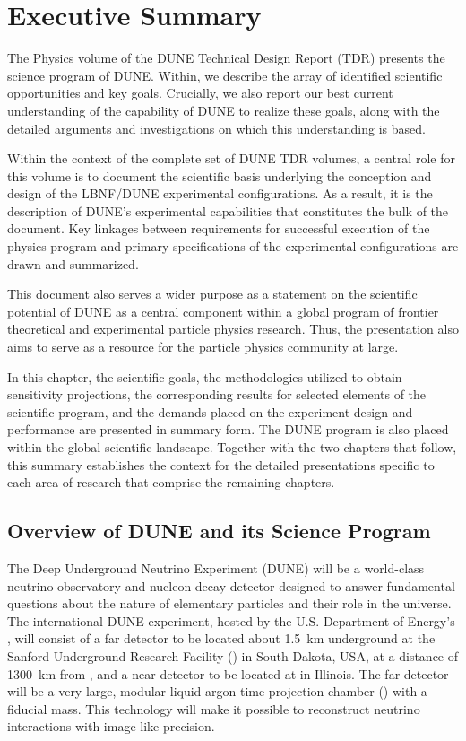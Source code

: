 \chapter{Executive Summary}
\label{ch:exec-summ}


The Physics volume of the DUNE Technical Design Report
(TDR) presents the science program of DUNE.
Within, we describe the array of 
identified scientific opportunities and key goals.  
Crucially, we also report our best current understanding
of the capability of DUNE to realize these goals,
along with the detailed arguments and investigations 
on which this understanding is based.

Within the context of the complete set of DUNE TDR volumes,
a central role for this volume is to document the scientific
basis underlying the conception and design of the LBNF/DUNE
experimental configurations.  As a result, it is the
description of DUNE's experimental capabilities that constitutes
the bulk of the document.  Key linkages between requirements for
successful execution of the physics program and
primary specifications of the experimental configurations
are drawn and summarized.

This document also serves a wider purpose as a statement on the
scientific potential of DUNE as a central component within
a global program of frontier theoretical and experimental
particle physics research. Thus, the presentation also
aims to serve as a resource for
the particle physics community at large.

In this chapter,
the scientific goals, the methodologies utilized to obtain
sensitivity projections, the corresponding results
for selected elements of the scientific program, and
the demands placed on the experiment design and performance
are presented in summary form.  The DUNE program is also
placed within the global scientific landscape.
Together with the two chapters that follow,
this summary establishes the context for the
detailed presentations specific to each area of
research that comprise the remaining chapters.


\section{Overview of DUNE and its Science Program}
\label{sec:exec-program-overview}

The Deep Underground Neutrino Experiment (DUNE) will be a
world-class neutrino observatory and nucleon decay detector
designed to answer
fundamental questions about the nature of elementary particles
and their role in the universe. The international DUNE
experiment, hosted by the U.S. Department of Energy's \fnal{},
will consist of a far detector to be located about \SI{1.5}{km}
underground at the Sanford Underground Research Facility
(\surf) in South Dakota, USA, at a distance of  \SI{1300}{\km}
from \fnal{}, and a near detector to be located at \fnal in
Illinois. The far detector will be a very large, modular
liquid argon time-projection chamber (\lartpc) with a
\fdfiducialmass fiducial mass. This \lar technology will make
it possible to reconstruct neutrino interactions
with image-like precision.

